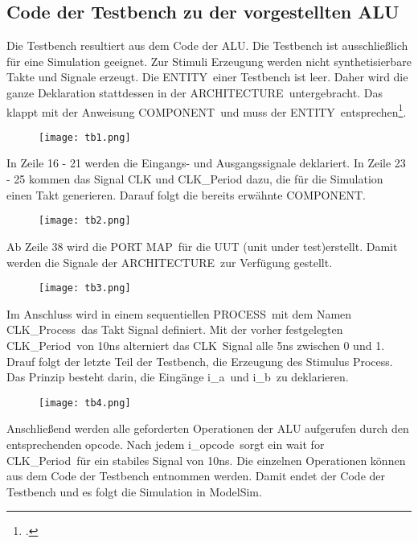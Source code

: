 \documentclass[12pt,a4paper]{scrartcl}	%
\begin{document}
\subsection{Code der Testbench zu der vorgestellten ALU}
Die Testbench resultiert aus dem Code der ALU. Die Testbench ist ausschließlich für eine Simulation geeignet. Zur Stimuli Erzeugung werden nicht synthetisierbare Takte und Signale erzeugt. Die \glqq ENTITY\grqq~einer Testbench ist leer. Daher wird die ganze Deklaration stattdessen in der \glqq ARCHITECTURE\grqq~untergebracht. Das  klappt mit der Anweisung \glqq COMPONENT\grqq~und muss der \glqq ENTITY\grqq~entsprechen\footcite[vgl.][S. 10]{Ein}.
\begin{figure}[htb]
	
	\texttt{[image: tb1.png]}
\end{figure}
In Zeile 16 - 21 werden die Eingangs- und Ausgangssignale deklariert. In Zeile 23 - 25 kommen das Signal CLK und CLK\_Period dazu, die für die Simulation einen Takt generieren. Darauf folgt die bereits erwähnte \glqq COMPONENT\grqq.
\begin{figure}[h]
	
	\texttt{[image: tb2.png]}
\end{figure}
Ab Zeile 38 wird die \glqq PORT MAP\grqq~für die UUT (unit under test)erstellt. Damit werden die Signale der \glqq ARCHITECTURE\grqq~zur Verfügung gestellt.
\begin{figure}[]
	
	\texttt{[image: tb3.png]}
\end{figure}
Im Anschluss wird in einem sequentiellen \glqq PROCESS\grqq~mit dem Namen \grqq CLK\_Process\grqq~das Takt Signal definiert. Mit der vorher festgelegten \glqq CLK\_Period\grqq~von 10ns alterniert das \glqq CLK\grqq~Signal alle 5ns zwischen 0 und 1.\\
Drauf folgt der letzte Teil der Testbench, die Erzeugung des \glqq Stimulus Process\grqq. Das Prinzip besteht darin, die Eingänge \glqq i\_a\grqq~und \glqq i\_b\grqq~zu deklarieren.
\begin{figure}[htb]
	
	\texttt{[image: tb4.png]}
\end{figure}
Anschließend werden alle geforderten Operationen der ALU aufgerufen durch den entsprechenden \glqq opcode\grqq. Nach jedem \glqq i\_opcode\grqq~sorgt ein \glqq wait for CLK\_Period\grqq~für ein stabiles Signal von 10ns. Die einzelnen Operationen können aus dem Code der Testbench entnommen werden. Damit endet der Code der Testbench und es folgt die Simulation in ModelSim.
\end{document}
